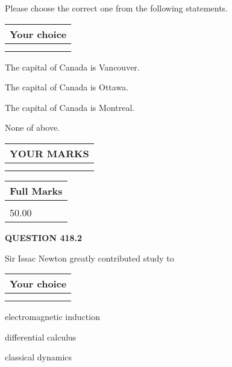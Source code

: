 \documentclass[12pt]{article}
\begin{document}
  
Please choose the correct one from the following statements.
  
  
\noindent\hspace{3.0in} \begin{tabular}{|l|}
\hline
Your choice \\
\hline
 \\ 
 \\ 
\hline
\end{tabular}
  
  
 
 
The capital of Canada is Vancouver.
 
 
The capital of Canada is Ottawa.
 
 
The capital of Canada is Montreal.
 
 
 None of above.
 
 
  
\vspace{0.2in}
  
\noindent\begin{tabular}{|l|}
\hline
 YOUR MARKS  \\
\hline
 \\ 
 \\ 
\hline
\end{tabular}
\hspace{0.05in} \begin{tabular}{|l|}
\hline
 Full Marks  \\
\hline
 \\ 
50.00 \\
\hline
\end{tabular}
{\textbf{\Large{QUESTION
418.2 
}}}
  
  
Sir Issac Newton greatly contributed study to
  
  
\noindent\hspace{3.0in} \begin{tabular}{|l|}
\hline
Your choice \\
\hline
 \\ 
 \\ 
\hline
\end{tabular}
  
  
 
 
electromagnetic induction
 
 
differential calculus
 
 
classical dynamics
 
\end{document}

